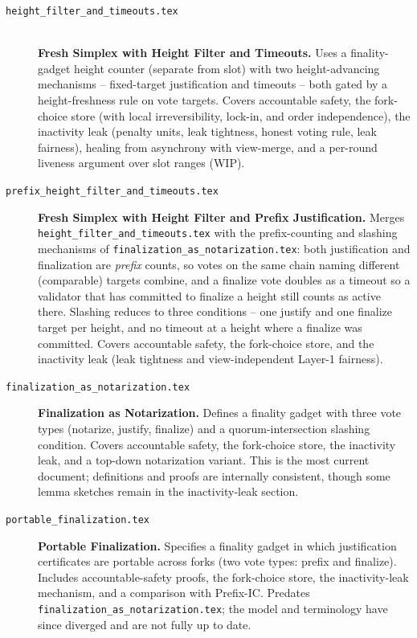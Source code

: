 \documentclass{article}
\begin{document}
\begin{description}

\item[\texttt{height\_filter\_and\_timeouts.tex}]
  \\
  \textbf{Fresh Simplex with Height Filter and Timeouts.}
  Uses a finality-gadget height counter (separate from slot) with two
  height-advancing mechanisms -- fixed-target justification and timeouts --
  both gated by a height-freshness rule on vote targets.
  Covers accountable safety, the fork-choice store
  (with local irreversibility, lock-in, and order independence),
  the inactivity leak (penalty units, leak tightness, honest voting rule,
  leak fairness), healing from asynchrony with view-merge,
  and a per-round liveness argument over slot ranges (WIP).

\item[\texttt{prefix\_height\_filter\_and\_timeouts.tex}]
  \textbf{Fresh Simplex with Height Filter and Prefix Justification.}
  Merges \texttt{height\_filter\_and\_timeouts.tex} with the prefix-counting and
  slashing mechanisms of \texttt{finalization\_as\_notarization.tex}: both
  justification and finalization are \emph{prefix} counts, so votes on the same
  chain naming different (comparable) targets combine, and a finalize vote
  doubles as a timeout so a validator that has committed to finalize a height
  still counts as active there. Slashing reduces to three conditions -- one
  justify and one finalize target per height, and no timeout at a height where
  a finalize was committed. Covers accountable safety, the fork-choice store,
  and the inactivity leak (leak tightness and view-independent Layer-1 fairness).

\item[\texttt{finalization\_as\_notarization.tex}] \textbf{Finalization as Notarization.}
  Defines a finality gadget with three vote types (notarize, justify, finalize)
  and a quorum-intersection slashing condition.
  Covers accountable safety, the fork-choice store, the inactivity leak,
  and a top-down notarization variant.
  This is the most current document; definitions and proofs are
  internally consistent, though some lemma sketches remain in the
  inactivity-leak section.

\item[\texttt{portable\_finalization.tex}] \textbf{Portable Finalization.}
  Specifies a finality gadget in which justification certificates are
  portable across forks (two vote types: prefix and finalize).
  Includes accountable-safety proofs, the fork-choice store,
  the inactivity-leak mechanism, and a comparison with Prefix-IC.
  Predates \texttt{finalization\_as\_notarization.tex};
  the model and terminology have since diverged and are not fully
  up to date.


\end{description}
\end{document}
